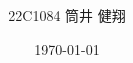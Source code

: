 \documentclass[platex, a4paper, 12pt, openany, oneside]{jsbook}
\title{
  \centering
    \scalebox{1.0}{ピーマン収穫用エンドエフェクタの開発}\\
    \vspace{-0.3zh}
    \scalebox{0.7}{鎌形エンドエフェクタの開発}
    \vspace{-0.6zh}
}
\date{\today}
\author{22C1084 筒井 健翔}
\begin{document}
\frontmatter{}
%

%
\mainmatter{}
%

\backmatter{}
%

%
\end{document}

